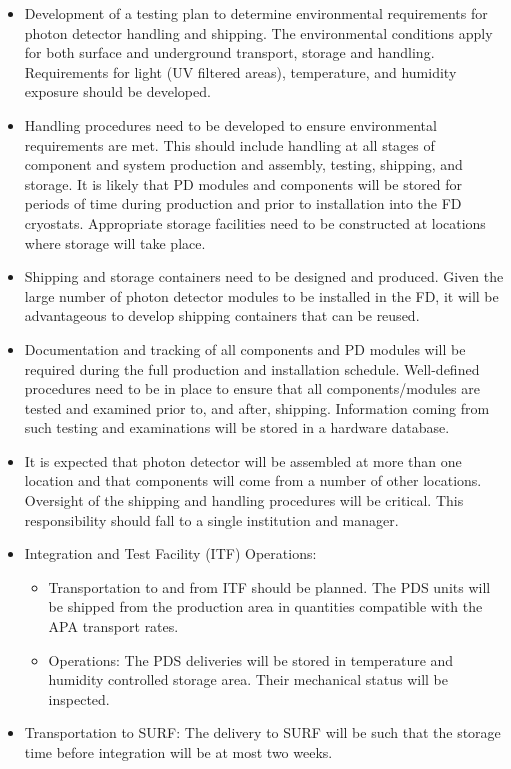 \begin{itemize}

\item Development of a testing plan to determine environmental requirements for photon detector handling and shipping. The environmental conditions apply for both surface and underground transport, storage and handling. Requirements for light (UV filtered areas), temperature, and humidity exposure should be developed.

\item Handling procedures need to be developed to ensure environmental requirements are met. This should include handling at all stages of component and system production and assembly, testing, shipping, and storage. It is likely that PD modules and components will be stored for periods of time during production and prior to installation into the FD cryostats. Appropriate storage facilities need to be constructed at locations where storage will take place.

\item Shipping and storage containers need to be designed and produced. Given the large number of photon detector modules to be installed in the FD, it will be advantageous to develop shipping containers that can be reused.

\item Documentation and tracking of all components and PD modules will be required during the full production and installation schedule. Well-defined procedures need to be in place to ensure that all components/modules are tested and examined prior to, and after, shipping. Information coming from such testing and examinations will be stored in a hardware database.

\item It is expected that photon detector will be assembled at more than one location and that components will come from a number of other locations. Oversight of the shipping and handling procedures will be critical. This responsibility should fall to a single institution and manager.

\item Integration and Test Facility (ITF) Operations:

	\begin{itemize}
	\item Transportation to and from ITF should be planned. The PDS units will be shipped from the production area in 	
	quantities compatible with the APA transport rates.   
	\item Operations: The PDS deliveries will be stored in temperature and humidity controlled storage area. Their mechanical 
	status will be inspected.
	\end{itemize}

\item Transportation to SURF: The delivery to SURF will be such that the storage time before integration will be at most two weeks.

\end{itemize}

